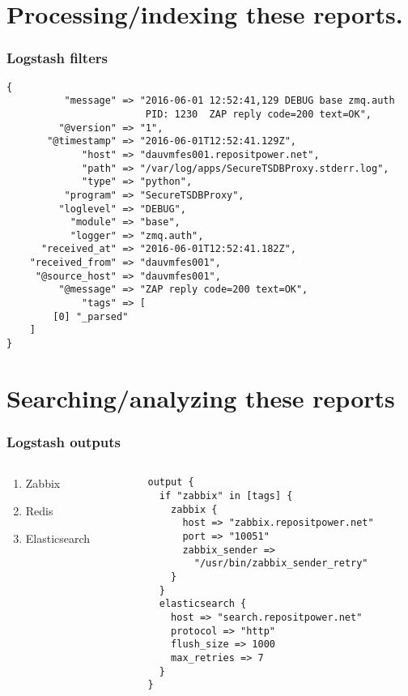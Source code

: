 \documentclass[13pt, ignorenonframetext]{beamer}
\begin{document}
\section{Processing/indexing these reports.}
\begin{frame}[fragile]
\frametitle{Logstash filters}
\begin{lstlisting}[basicstyle=\scriptsize]
{
          "message" => "2016-06-01 12:52:41,129 DEBUG base zmq.auth 
                        PID: 1230  ZAP reply code=200 text=OK",
         "@version" => "1",
       "@timestamp" => "2016-06-01T12:52:41.129Z",
             "host" => "dauvmfes001.repositpower.net",
             "path" => "/var/log/apps/SecureTSDBProxy.stderr.log",
             "type" => "python", 
          "program" => "SecureTSDBProxy",
         "loglevel" => "DEBUG",
           "module" => "base",
           "logger" => "zmq.auth",  
      "received_at" => "2016-06-01T12:52:41.182Z",
    "received_from" => "dauvmfes001",
     "@source_host" => "dauvmfes001",
         "@message" => "ZAP reply code=200 text=OK",
             "tags" => [
        [0] "_parsed"
    ]
}
\end{lstlisting}
\end{frame}

\section{Searching/analyzing these reports}
\begin{frame}[fragile]
\frametitle{Logstash outputs}
      \begin{columns}[c] %
     \begin{column}{3.0cm} %
\begin{enumerate}
\item Zabbix
\item Redis
\item Elasticsearch
\end{enumerate}
     \end{column}
     \begin{column}{6.0cm} %
\begin{lstlisting}[basicstyle=\scriptsize]
output {
  if "zabbix" in [tags] {
    zabbix {
      host => "zabbix.repositpower.net"
      port => "10051"
      zabbix_sender => 
        "/usr/bin/zabbix_sender_retry"
    }
  }
  elasticsearch {
    host => "search.repositpower.net"
    protocol => "http"
    flush_size => 1000
    max_retries => 7
  }
}
\end{lstlisting}
     \end{column}
     \end{columns}
\end{frame}
\end{document}

